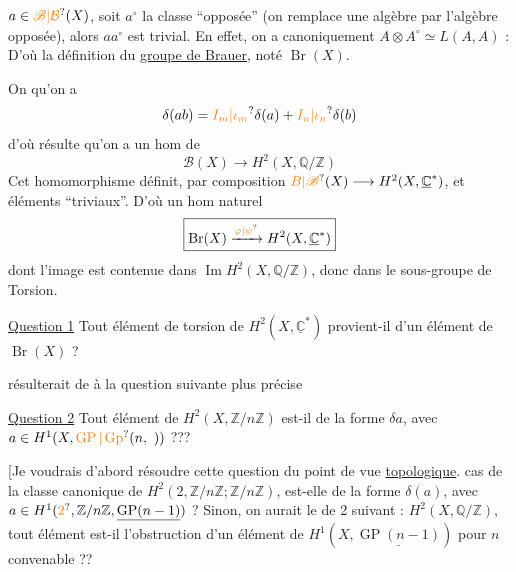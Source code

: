 $a\in\unsure{\mathscr{B}|\mathcal{B}}(X)$, soit $a^\circ$ la classe ``opposée'' (on remplace une algèbre par l'algèbre opposée), alors $aa^\circ$ est trivial. En effet, on a canoniquement $A\otimes A^\circ\simeq L(A,A)$ : D'où la définition du \uline{groupe de Brauer}, noté $\operatorname{Br}(X)$.

On  qu'on a
\[
\delta(ab)=\unsure{I_m|\iota_m}\delta(a)+\unsure{I_n|\iota_n}\delta(b)
\]
d'où résulte qu'on a un hom de  
\[
\mathscr{B}(X)\longrightarrow H^2(X,\mathbb{Q}/\mathbb{Z})
\]
Cet homomorphisme définit, par composition
$\unsure{B|\mathscr{B}}(X)\longrightarrow H^2(X,\underline{\mathbb{C}}^*)$,  et     éléments ``triviaux''.  D'où un hom naturel 
\[
\boxed{\operatorname{Br}(X)\xrightarrow{\unsure{\varphi|\psi}}H^2(X,\underline{\mathbb{C}}^*)}
\]
dont l'image est contenue dans $\operatorname{Im}H^2(X,\mathbb{Q}/\mathbb{Z})$, donc dans le sous-groupe de Torsion.

\uline{Question 1} Tout élément de torsion de $H^2(X,\underline{\mathbb{C}}^*)$ provient-il d'un élément de $\operatorname{Br}(X)$ ?

 résulterait de  à la question suivante plus précise

\uline{Question 2} Tout élément de $H^2(X,\mathbb{Z}/n\mathbb{Z})$ est-il de la forme $\delta a$, avec $a\in H^1(X,\unsure{\operatorname{GP}|\operatorname{Gp}}(n,\ ))$ ???

[Je voudrais d'abord résoudre cette question du point de vue \uline{topologique}.  cas de la classe canonique de $H^2(2,\mathbb{Z}/n\mathbb{Z};\mathbb{Z}/n\mathbb{Z})$, est-elle de la forme $\delta(a)$, avec $a\in H^1(\unsure{2},\mathbb{Z}/n\mathbb{Z},\underline{\operatorname{GP}(n-1)})$ ?
Sinon, on aurait le  de 2 suivant : $H^2(X,\mathbb{Q}/\mathbb{Z})$, tout élément est-il l'obstruction d'un élément de $H^1(X,\underline{\operatorname{GP}(n-1)})$ pour $n$ convenable ??

